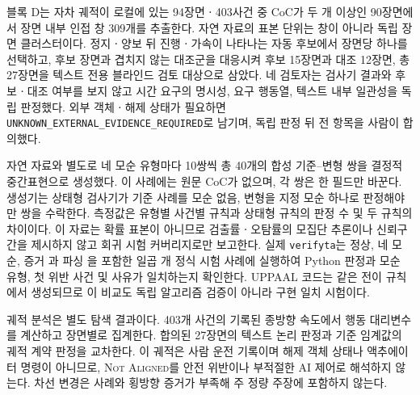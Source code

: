 블록 D는 자차 궤적이 로컬에 있는 94장면ㆍ403사건 중 CoC가 두 개 이상인 90장면에서 장면 내부 인접 창 309개를 추출한다. 자연 자료의 표본 단위는 창이 아니라 독립 장면 클러스터이다. 정지ㆍ양보 뒤 진행ㆍ가속이 나타나는 자동 후보에서 장면당 하나를 선택하고, 후보 장면과 겹치지 않는 대조군을 대응시켜 후보 15장면과 대조 12장면, 총 27장면을 텍스트 전용 블라인드 검토 대상으로 삼았다. 네 검토자는 검사기 결과와 후보ㆍ대조 여부를 보지 않고 시간 요구의 명시성, 요구 행동열, 텍스트 내부 일관성을 독립 판정했다. 외부 객체ㆍ해제 상태가 필요하면 \texttt{UNKNOWN\_EXTERNAL\_EVIDENCE\_REQUIRED}로 남기며, 독립 판정 뒤 전 항목을 사람이 합의했다.

자연 자료와 별도로 네 모순 유형마다 10쌍씩 총 40개의 합성 기준--변형 쌍을 결정적 중간표현으로 생성했다. 이 사례에는 원문 CoC가 없으며, 각 쌍은 한 필드만 바꾼다. 생성기는 상태형 검사기가 기준 사례를 모순 없음, 변형을 지정 모순 하나로 판정해야만 쌍을 수락한다. 측정값은 유형별 사건별 규칙과 상태형 규칙의 판정 수 및 두 규칙의 차이이다. 이 자료는 확률 표본이 아니므로 검출률ㆍ오탐률의 모집단 추론이나 신뢰구간을 제시하지 않고 회귀 시험 커버리지로만 보고한다. 실제 \texttt{verifyta}는 정상, 네 모순, 증거 {\unknown}과 파싱 {\unknown}을 포함한 일곱 개 정식 시험 사례에 실행하여 Python 판정과 모순 유형, 첫 위반 사건 및 {\unknown} 사유가 일치하는지 확인한다. UPPAAL 코드는 같은 전이 규칙에서 생성되므로 이 비교도 독립 알고리즘 검증이 아니라 구현 일치 시험이다.

궤적 분석은 별도 탐색 결과이다. 403개 사건의 기록된 종방향 속도에서 행동 대리변수를 계산하고 장면별로 집계한다. 합의된 27장면의 텍스트 논리 판정과 기준 임계값의 궤적 계약 판정을 교차한다. 이 궤적은 사람 운전 기록이며 해제 객체 상태나 액추에이터 명령이 아니므로, \textsc{Not Aligned}를 안전 위반이나 부적절한 AI 제어로 해석하지 않는다. 차선 변경은 사례와 횡방향 증거가 부족해 주 정량 주장에 포함하지 않는다.

